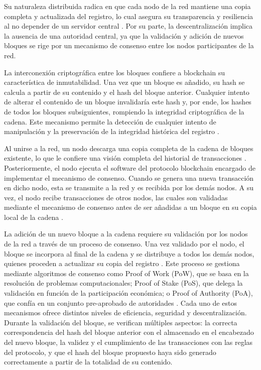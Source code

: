 Su naturaleza distribuida radica en que cada nodo de la red mantiene una copia completa y actualizada del registro, lo cual asegura su transparencia y resiliencia al no depender de un servidor central \cite{bulkowska2023implementation}. Por su parte, la descentralización implica la ausencia de una autoridad central, ya que la validación y adición de nuevos bloques se rige por un mecanismo de consenso entre los nodos participantes de la red. 

La interconexión criptográfica entre los bloques confiere a blockchain su característica de inmutabilidad. Una vez que un bloque es añadido, su hash se calcula a partir de su contenido y el hash del bloque anterior. Cualquier intento de alterar el contenido de un bloque invalidaría este hash y, por ende, los hashes de todos los bloques subsiguientes, rompiendo la integridad criptográfica de la cadena. Este mecanismo permite la detección de cualquier intento de manipulación y la preservación de la integridad histórica del registro \cite{bulkowska2023implementation}.


Al unirse a la red, un nodo descarga una copia completa de la cadena de bloques existente, lo que le confiere una visión completa del historial de transacciones \cite{bulkowska2023implementation}. Posteriormente, el nodo ejecuta el software del protocolo blockchain encargado de implementar el mecanismo de consenso. Cuando se genera una nueva transacción en dicho nodo, esta se transmite a la red y es recibida por los demás nodos. A su vez, el nodo recibe transacciones de otros nodos, las cuales son validadas mediante el mecanismo de consenso antes de ser añadidas a un bloque en su copia local de la cadena \cite{bulkowska2023implementation}.

La adición de un nuevo bloque a la cadena requiere su validación por los nodos de la red a través de un proceso de consenso. Una vez validado por el nodo, el bloque se incorpora al final de la cadena y se distribuye a todos los demás nodos, quienes proceden a actualizar su copia del registro \cite{bulkowska2023implementation}. Este proceso se gestiona mediante algoritmos de consenso como Proof of Work (PoW), que se basa en la resolución de problemas computacionales; Proof of Stake (PoS), que delega la validación en función de la participación económica; o Proof of Authority (PoA), que confía en un conjunto pre-aprobado de autoridades \cite{diaz2022protocolos}. Cada uno de estos mecanismos ofrece distintos niveles de eficiencia, seguridad y descentralización. Durante la validación del bloque, se verifican múltiples aspectos: la correcta correspondencia del hash del bloque anterior con el almacenado en el encabezado del nuevo bloque, la validez y el cumplimiento de las transacciones con las reglas del protocolo, y que el hash del bloque propuesto haya sido generado correctamente a partir de la totalidad de su contenido.


